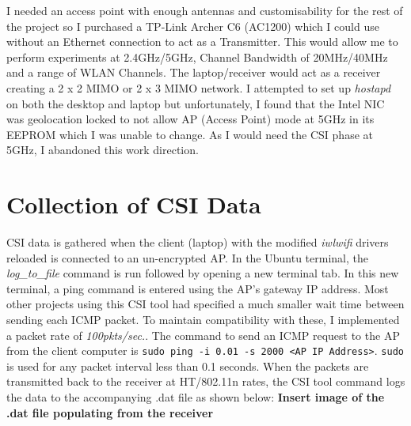I needed an access point with enough antennas and customisability for the rest of the project so I purchased a TP-Link Archer C6 (AC1200) which I could use without an Ethernet connection to act as a Transmitter. This would allow me to perform experiments at 2.4GHz/5GHz, Channel Bandwidth of 20MHz/40MHz and a range of WLAN Channels. The laptop/receiver would act as a receiver creating a 2 x 2 MIMO or 2 x 3 MIMO network. I attempted to set up \textit{hostapd} on both the desktop and laptop but unfortunately, I found that the Intel NIC was geolocation locked to not allow AP (Access Point) mode at 5GHz in its EEPROM which I was unable to change. As I would need the CSI phase at 5GHz, I abandoned this work direction. 
\section{Collection of CSI Data}
CSI data is gathered when the client (laptop) with the modified \textit{iwlwifi} drivers reloaded is connected to an un-encrypted AP. In the Ubuntu terminal, the \textit{log\_to\_file} command is run followed by opening a new terminal tab. In this new terminal, a ping command is entered using the AP's gateway IP address. Most other projects using this CSI tool had specified a much smaller wait time between sending each ICMP packet. To maintain compatibility with these, I implemented a packet rate of \textit{100pkts/sec.}. The command to send an ICMP request to the AP from the client computer is \lstinline{sudo ping -i 0.01 -s 2000 <AP IP Address>}. \lstinline{sudo} is used for any packet interval less than 0.1 seconds. When the packets are transmitted back to the receiver at HT/802.11n rates, the CSI tool command logs the data to the accompanying .dat file as shown below:
\textbf{Insert image of the .dat file populating from the receiver}
